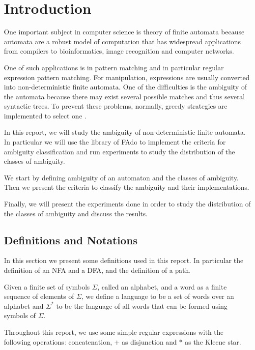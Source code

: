 \chapter{Introduction}
One important subject in computer science is theory of finite automata because automata are a robust model of computation that has widespread applications from compilers to bioinformatics, image recognition and computer networks.

One of such applications is in pattern matching and in particular regular expression pattern matching. For manipulation, expressions are usually converted into non-deterministic finite automata. One of the difficulties is the ambiguity of the automata because there may exist several possible matches and thus several syntactic trees. To prevent these problems, normally, greedy strategies are implemented to select one \cite{BorsottiBCM15}.

In this report, we will study the ambiguity of non-deterministic finite automata. In particular we will use the library of FAdo \cite{BRODA201994} to implement the criteria for ambiguity classification and run experiments to study the distribution of the classes of ambiguity.

We start by defining ambiguity of an automaton and the classes of ambiguity. Then we present the criteria to classify the ambiguity and their implementations.

Finally, we will present the experiments done in order to study the distribution of the classes of ambiguity and discuss the results.

\section{Definitions and Notations}
In this section we present some definitions used in this report. In particular the definition of an NFA and a DFA, and the definition of a path.


Given a finite set of symbols $\Sigma$, called an alphabet, and a word as a finite sequence of elements of $\Sigma$, we define a language to be a set of words over an alphabet and $\Sigma^*$ to be the language of all words that can be formed using symbols of $\Sigma$.

Throughout this report, we use some simple regular expressions with the following operations: concatenation, $+$ as disjunction and $*$ as the Kleene star.

